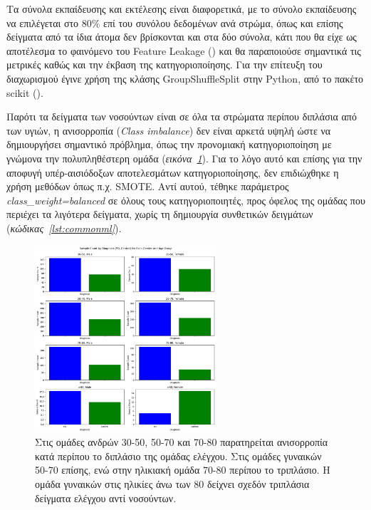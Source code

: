 \documentclass[12pt]{report}
\begin{document}
        \par
            Τα σύνολα εκπαίδευσης και εκτέλεσης είναι διαφορετικά, με το σύνολο εκπαίδευσης να επιλέγεται στο 80\% επί του συνόλου δεδομένων ανά στρώμα, όπως και επίσης δείγματα από τα ίδια άτομα δεν βρίσκονται και στα δύο σύνολα, κάτι που θα είχε ως αποτέλεσμα το φαινόμενο του Feature Leakage (\emph{\cite{Oosterhuis2024LocalPredictions}}) και θα παραποιούσε σημαντικά τις μετρικές καθώς και την έκβαση της κατηγοριοποίησης. Για την επίτευξη του διαχωρισμού έγινε χρήση της κλάσης GroupShuffleSplit στην Python, από το πακέτο scikit (\emph{\cite{Buitinck2013APIProject}}). 
        \par
            Παρότι τα δείγματα των νοσούντων είναι σε όλα τα στρώματα περίπου διπλάσια από των υγιών, η ανισορροπία (\emph{Class imbalance}) δεν είναι αρκετά υψηλή ώστε να δημιουργήσει σημαντικό πρόβλημα, όπως την προνομιακή κατηγοριοποίηση με γνώμονα την πολυπληθέστερη ομάδα (\emph{εικόνα~\ref{fig:ppmi-visual-bar-class-imb}}). Για το λόγο αυτό και επίσης για την αποφυγή υπέρ-αισιόδοξων αποτελεσμάτων κατηγοριοποίησης, δεν επιδιώχθηκε η χρήση μεθόδων όπως π.χ.  SMOTE. Αντί αυτού, τέθηκε παράμετρος \emph{class\_weight=balanced} σε όλους τους κατηγοριοποιητές, προς όφελος της ομάδας που περιέχει τα λιγότερα δείγματα, χωρίς τη δημιουργία συνθετικών δειγμάτων (\emph{κώδικας~\ref{lst:commonml}}).

            \begin{figure}[H]
                \centering
                \includegraphics[width=0.6\textwidth]{ML/ppmi-visual-bar-class-imb.png}
                \caption[Απεικόνιση ανισορροπίας μεταξύ των ομάδων της μελέτης] {Στις ομάδες ανδρών 30-50, 50-70 και 70-80 παρατηρείται ανισορροπία κατά περίπου το διπλάσιο της ομάδας ελέγχου. Στις ομάδες γυναικών 50-70 επίσης, ενώ στην ηλικιακή ομάδα 70-80 περίπου το τριπλάσιο. Η ομάδα γυναικών στις ηλικίες άνω των 80 δείχνει σχεδόν τριπλάσια δείγματα ελέγχου αντί νοσούντων.}
                \label{fig:ppmi-visual-bar-class-imb}
            \end{figure}
\end{document}
